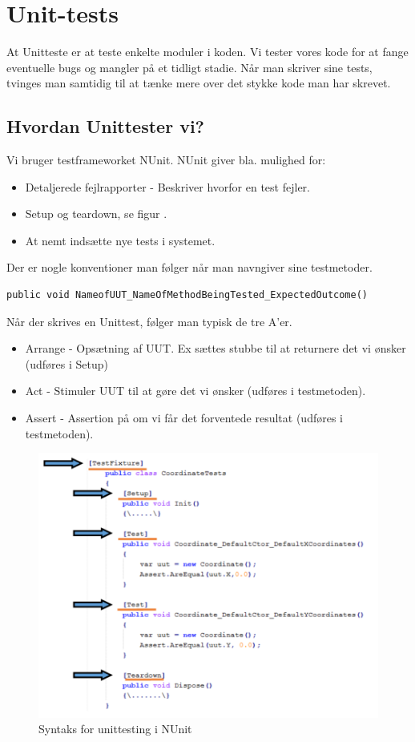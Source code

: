 \section{Unit-tests}
At Unitteste er at teste enkelte moduler i koden. Vi tester vores kode for at fange eventuelle bugs og mangler på et tidligt stadie. Når man skriver sine tests, tvinges man samtidig til at tænke mere over det stykke kode man har skrevet.

\subsection{Hvordan Unittester vi?}
Vi bruger testframeworket NUnit. NUnit giver bla. mulighed for:
\begin{itemize}
	\item Detaljerede fejlrapporter - Beskriver hvorfor en test fejler.
	\item Setup og teardown, se figur .
	\item At nemt indsætte nye tests i systemet.
\end{itemize}

Der er nogle konventioner man følger når man navngiver sine testmetoder.

\begin{lstlisting}
public void NameofUUT_NameOfMethodBeingTested_ExpectedOutcome()
\end{lstlisting}

Når der skrives en Unittest, følger man typisk de tre A'er.

\begin{itemize}
	\item Arrange - Opsætning af UUT. Ex sættes stubbe til at returnere det vi ønsker (udføres i Setup)
	\item Act - Stimuler UUT til at gøre det vi ønsker (udføres i testmetoden).
	\item Assert - Assertion på om vi får det forventede resultat (udføres i testmetoden).
\end{itemize}

\begin{figure}
\centering
\includegraphics[width=0.7\linewidth]{figs/testFixture.PNG}
\caption{Syntaks for unittesting i NUnit}
\label{fig:testFixture}
\end{figure}
